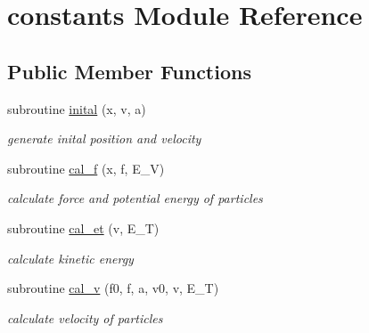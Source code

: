 \hypertarget{classconstants}{}\section{constants Module Reference}
\label{classconstants}
\subsection*{Public Member Functions}
\begin{DoxyCompactItemize}
\item 
\hypertarget{classconstants_a8fa95719842e3955bbc8bca0dd4e1219}{}subroutine \hyperlink{classconstants_a8fa95719842e3955bbc8bca0dd4e1219}{inital} (x, v, a)\label{classconstants_a8fa95719842e3955bbc8bca0dd4e1219}

\begin{DoxyCompactList}\small\item\em generate inital position and velocity \end{DoxyCompactList}\item 
\hypertarget{classconstants_ad447f84227b1711f7dcce45c2afe5776}{}subroutine \hyperlink{classconstants_ad447f84227b1711f7dcce45c2afe5776}{cal\+\_\+f} (x, f, E\+\_\+\+V)\label{classconstants_ad447f84227b1711f7dcce45c2afe5776}

\begin{DoxyCompactList}\small\item\em calculate force and potential energy of particles \end{DoxyCompactList}\item 
\hypertarget{classconstants_ae985e976fc507a6fd59d2a5a5d2ec792}{}subroutine \hyperlink{classconstants_ae985e976fc507a6fd59d2a5a5d2ec792}{cal\+\_\+et} (v, E\+\_\+\+T)\label{classconstants_ae985e976fc507a6fd59d2a5a5d2ec792}

\begin{DoxyCompactList}\small\item\em calculate kinetic energy \end{DoxyCompactList}\item 
\hypertarget{classconstants_aab33af257c865f6234314d7572258351}{}subroutine \hyperlink{classconstants_aab33af257c865f6234314d7572258351}{cal\+\_\+v} (f0, f, a, v0, v, E\+\_\+\+T)\label{classconstants_aab33af257c865f6234314d7572258351}

\begin{DoxyCompactList}\small\item\em calculate velocity of particles \end{DoxyCompactList}\end{DoxyCompactItemize}
